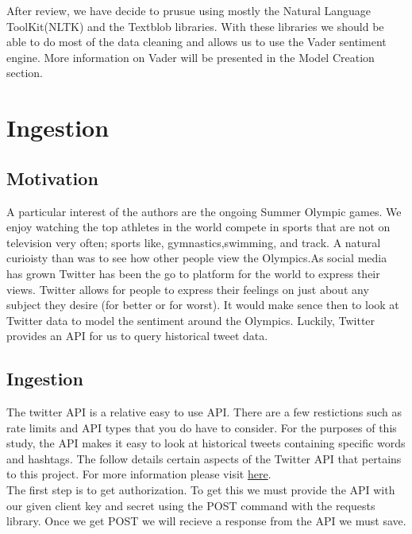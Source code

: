 \documentclass[12pt]{article}
\begin{document}
            After review, we have decide to prusue using mostly the Natural Language ToolKit(NLTK) and the Textblob libraries. With these libraries we should be able to do most of the data 
            cleaning and allows us to use the Vader sentiment engine. More information on Vader will be presented in the Model Creation section.

    \section{Ingestion}
        \subsection{Motivation}
            A particular interest of the authors are the ongoing Summer Olympic games. We enjoy watching the top athletes in the world compete in sports that are not on television very 
            often; sports like, gymnastics,swimming, and track. A natural curioisty than was to see how other people view the Olympics.As social media has grown Twitter has been the go to 
            platform for the world to express their views. Twitter allows for people to express their feelings on just about any subject they desire (for better or for worst). It would make 
            sence then to look at Twitter data to model the sentiment around the Olympics. Luckily, Twitter provides an API  for us to query historical tweet data.

        \subsection{Ingestion}
            The twitter API is a relative easy to use API. There are a few restictions such as rate limits and API types that you do have to consider. For the purposes of this study, 
            the API makes it easy to look at historical tweets containing specific words and hashtags. The follow details certain aspects of the Twitter API that pertains to this 
            project. For more information please visit \href{https://developer.twitter.com/en/docs/twitter-api}{here}. \\

            The first step is to get authorization. To get this we must provide the API with our given client key and secret using the POST command with the requests library. Once we get
            POST we will recieve a response from the API we must save.
            
\end{document}
